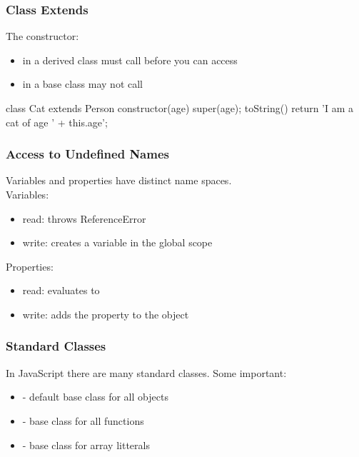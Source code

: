 \begin{frame}[fragile] \frametitle{Class Extends}
The constructor:
\begin{itemize}
  \item in a derived class must call  before you can access 
  \item in a base class may not call 
\end{itemize}
\begin{CodeBox}{}
class Cat extends Person {
  constructor(age) {
    super(age);
  }
  toString() {
    return 'I am a cat of age ' + this.age';
  }
}
\end{CodeBox}
\end{frame}

\begin{frame}[fragile] \frametitle{Access to Undefined Names}
Variables and properties have distinct name spaces.
\\ \vspace{4mm}
Variables:
\begin{itemize}
  \item read: throws ReferenceError
  \item write: creates a variable in the global scope
\end{itemize}
\vspace{5mm}
Properties:
\begin{itemize}
  \item read: evaluates to 
  \item write: adds the property to the object
\end{itemize}
\end{frame}

\begin{frame}[fragile] \frametitle{Standard Classes}
In JavaScript there are many standard classes. Some important: 
\begin{itemize}
  \item {} - default base class for all objects
  \item {} - base class for all functions
  \item {} - base class for array litterals
\end{itemize}
\end{frame}

